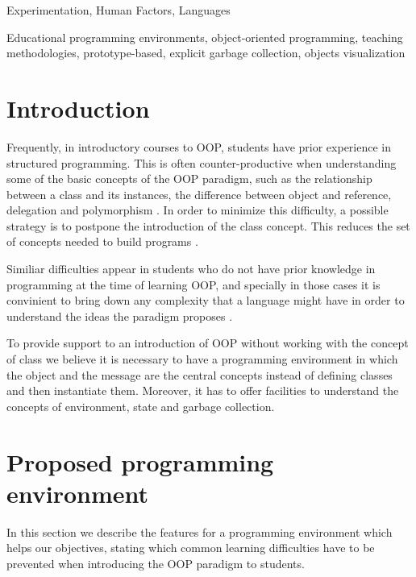 \documentclass{sigplanconf}
\begin{document}

\terms
Experimentation, Human Factors, Languages

\keywords
Educational programming environments, object-oriented programming, teaching methodologies, prototype-based, explicit garbage collection, objects visualization

\section{Introduction}

Frequently, in introductory courses to OOP, students have prior experience in structured programming. 
This is often counter-productive when understanding some of the basic concepts of the OOP paradigm, such as the relationship between a class and its instances, the difference between object and reference, delegation and polymorphism \cite{Weir05}. In order to minimize this difficulty, a possible strategy is to postpone the introduction of the class concept. This reduces the set of concepts needed to build programs \cite{Lomb07}. 

Similiar difficulties appear in students who do not have prior knowledge in programming at the time of learning OOP, and specially in those cases it is convinient to bring down any complexity that a language might have in order to understand the ideas the paradigm proposes \cite{Vent04}.

To provide support to an introduction of OOP without working with the concept of class we believe it is necessary to have a programming environment in which the object and the message are the central concepts instead of defining classes and then instantiate them.
Moreover, it has to offer facilities to understand the concepts of environment, state and garbage collection.

\section{Proposed programming environment}

In this section we describe the features for a programming environment which helps our objectives, 
stating which common learning difficulties have to be prevented when introducing the OOP paradigm to students. 
\end{document}
